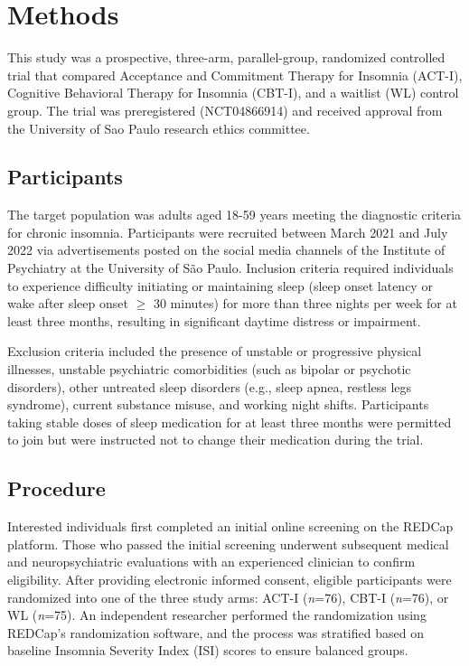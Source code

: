\documentclass[
  man]{apa6}
\begin{document}
\section{Methods}\label{methods}

This study was a prospective, three-arm, parallel-group, randomized controlled trial that compared Acceptance and Commitment Therapy for Insomnia (ACT-I), Cognitive Behavioral Therapy for Insomnia (CBT-I), and a waitlist (WL) control group. The trial was preregistered (NCT04866914) and received approval from the University of Sao Paulo research ethics committee.

\subsection{Participants}\label{participants}

The target population was adults aged 18-59 years meeting the diagnostic criteria for chronic insomnia. Participants were recruited between March 2021 and July 2022 via advertisements posted on the social media channels of the Institute of Psychiatry at the University of São Paulo. Inclusion criteria required individuals to experience difficulty initiating or maintaining sleep (sleep onset latency or wake after sleep onset \(\geq\) 30 minutes) for more than three nights per week for at least three months, resulting in significant daytime distress or impairment.

Exclusion criteria included the presence of unstable or progressive physical illnesses, unstable psychiatric comorbidities (such as bipolar or psychotic disorders), other untreated sleep disorders (e.g., sleep apnea, restless legs syndrome), current substance misuse, and working night shifts. Participants taking stable doses of sleep medication for at least three months were permitted to join but were instructed not to change their medication during the trial.

\subsection{Procedure}\label{procedure}

Interested individuals first completed an initial online screening on the REDCap platform. Those who passed the initial screening underwent subsequent medical and neuropsychiatric evaluations with an experienced clinician to confirm eligibility. After providing electronic informed consent, eligible participants were randomized into one of the three study arms: ACT-I (\emph{n}=76), CBT-I (\emph{n}=76), or WL (\emph{n}=75). An independent researcher performed the randomization using REDCap's randomization software, and the process was stratified based on baseline Insomnia Severity Index (ISI) scores to ensure balanced groups.
\end{document}
